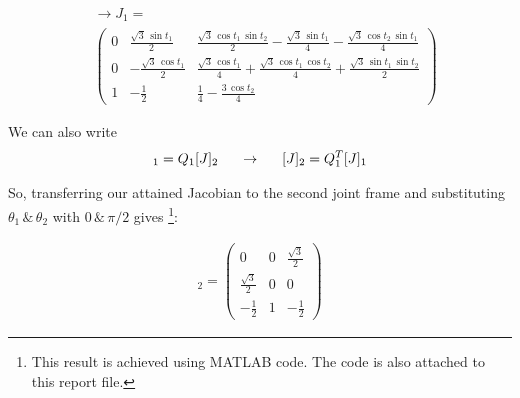 \documentclass[conference]{IEEEtran}
\begin{document}
\begin{align*}
     & \rightarrow J_1 =                                                                                                                                                                                                                                                                                                                                                                                                                                                                                                                                                                                                                                                                                                                                                                                                                                                                                     \\
     & \left(\begin{array}{ccc} 0 & \frac{\sqrt{3}\,\sin t_{1} }{2} & \frac{\sqrt{3}\,\cos t_{1} \,\sin t_{2} }{2}-\frac{\sqrt{3}\,\sin t_{1} }{4}-\frac{\sqrt{3}\,\cos t_{2} \,\sin t_{1} }{4}\\ 0 & -\frac{\sqrt{3}\,\cos t_{1} }{2} & \frac{\sqrt{3}\,\cos t_{1} }{4}+\frac{\sqrt{3}\,\cos t_{1} \,\cos t_{2} }{4}+\frac{\sqrt{3}\,\sin t_{1} \,\sin t_{2} }{2}\\ 1 & -\frac{1}{2} & \frac{1}{4}-\frac{3\,\cos t_{2} }{4} \end{array}\right)
\end{align*}


We can also write
\begin{align}
    [J]_1 = Q_1 [J]_2 \hspace{15px}\rightarrow\hspace{15px} [J]_2 = Q_1^T[J]_1
\end{align}

So, transferring our attained Jacobian to the second joint frame and substituting $\theta_1 \,\&\, \theta_2$ with $0 \,\&\, \pi/2$ gives \footnote{This result is achieved using MATLAB code. The code is also attached to this report file.}:

\begin{gather*}
    [J]_2 = \left(\begin{array}{ccc} 0 & 0 & \frac{\sqrt{3}}{2}\\ \frac{\sqrt{3}}{2} & 0 & 0\\ -\frac{1}{2} & 1 & -\frac{1}{2} \end{array}\right)
\end{gather*}
\end{document}
